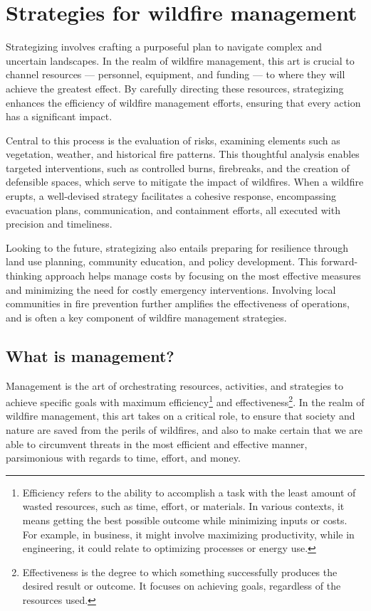 \documentclass[
  12 pt,
]{Nemilov}
\begin{document}
\chapter{Strategies for wildfire management}\label{strategies-for-wildfire-management}

Strategizing involves crafting a purposeful plan to navigate complex and uncertain landscapes. In the realm of wildfire management, this art is crucial to channel resources --- personnel, equipment, and funding --- to where they will achieve the greatest effect. By carefully directing these resources, strategizing enhances the efficiency of wildfire management efforts, ensuring that every action has a significant impact.

Central to this process is the evaluation of risks, examining elements such as vegetation, weather, and historical fire patterns. This thoughtful analysis enables targeted interventions, such as controlled burns, firebreaks, and the creation of defensible spaces, which serve to mitigate the impact of wildfires. When a wildfire erupts, a well-devised strategy facilitates a cohesive response, encompassing evacuation plans, communication, and containment efforts, all executed with precision and timeliness.

Looking to the future, strategizing also entails preparing for resilience through land use planning, community education, and policy development. This forward-thinking approach helps manage costs by focusing on the most effective measures and minimizing the need for costly emergency interventions. Involving local communities in fire prevention further amplifies the effectiveness of operations, and is often a key component of wildfire management strategies.

\section{What is management?}\label{what-is-management}

Management is the art of orchestrating resources, activities, and strategies to achieve specific goals with maximum efficiency\footnote{Efficiency refers to the ability to accomplish a task with the least amount of wasted resources, such as time, effort, or materials. In various contexts, it means getting the best possible outcome while minimizing inputs or costs. For example, in business, it might involve maximizing productivity, while in engineering, it could relate to optimizing processes or energy use.} and effectiveness\footnote{Effectiveness is the degree to which something successfully produces the desired result or outcome. It focuses on achieving goals, regardless of the resources used.}. In the realm of wildfire management, this art takes on a critical role, to ensure that society and nature are saved from the perils of wildfires, and also to make certain that we are able to circumvent threats in the most efficient and effective manner, parsimonious with regards to time, effort, and money.
\end{document}
